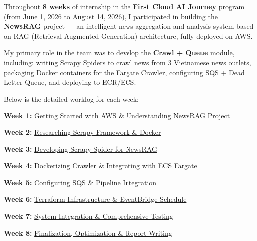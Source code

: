 Throughout \textbf{8 weeks} of internship in the \textbf{First Cloud AI
Journey} program (from June 1, 2026 to August 14, 2026), I participated
in building the \textbf{NewsRAG} project --- an intelligent news
aggregation and analysis system based on RAG (Retrieval-Augmented
Generation) architecture, fully deployed on AWS.

My primary role in the team was to develop the \textbf{Crawl + Queue}
module, including: writing Scrapy Spiders to crawl news from 3
Vietnamese news outlets, packaging Docker containers for the Fargate
Crawler, configuring SQS + Dead Letter Queue, and deploying to ECR/ECS.

Below is the detailed worklog for each week:

\textbf{Week 1:} \href{1.1-week1/}{Getting Started with AWS \&
Understanding NewsRAG Project}

\textbf{Week 2:} \href{1.2-week2/}{Researching Scrapy Framework \&
Docker}

\textbf{Week 3:} \href{1.3-week3/}{Developing Scrapy Spider for NewsRAG}

\textbf{Week 4:} \href{1.4-week4/}{Dockerizing Crawler \& Integrating
with ECS Fargate}

\textbf{Week 5:} \href{1.5-week5/}{Configuring SQS \& Pipeline
Integration}

\textbf{Week 6:} \href{1.6-week6/}{Terraform Infrastructure \&
EventBridge Schedule}

\textbf{Week 7:} \href{1.7-week7/}{System Integration \& Comprehensive
Testing}

\textbf{Week 8:} \href{1.8-week8/}{Finalization, Optimization \& Report
Writing}
